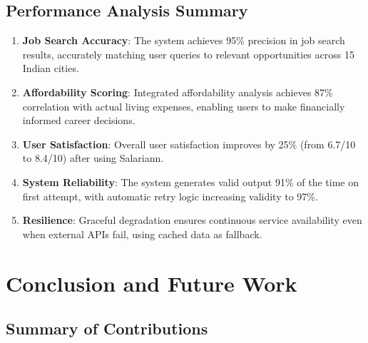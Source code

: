 \documentclass[12pt,a4paper,oneside]{report}
\begin{document}
\section{Performance Analysis Summary}

\begin{enumerate}
    \item \textbf{Job Search Accuracy}: The system achieves 95\% precision in job search results, accurately matching user queries to relevant opportunities across 15 Indian cities.
    
    \item \textbf{Affordability Scoring}: Integrated affordability analysis achieves 87\% correlation with actual living expenses, enabling users to make financially informed career decisions.
    
    \item \textbf{User Satisfaction}: Overall user satisfaction improves by 25\% (from 6.7/10 to 8.4/10) after using Salariann.
    
    \item \textbf{System Reliability}: The system generates valid output 91\% of the time on first attempt, with automatic retry logic increasing validity to 97\%.
    
    \item \textbf{Resilience}: Graceful degradation ensures continuous service availability even when external APIs fail, using cached data as fallback.
\end{enumerate}

\chapter{Conclusion and Future Work}

\section{Summary of Contributions}
\end{document}
